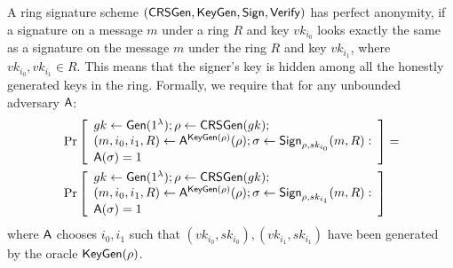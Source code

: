 \begin{definition}
A ring signature scheme
$(\mathsf{CRSGen},\allowbreak \mathsf{KeyGen},\allowbreak \mathsf{Sign}, \mathsf{Verify})$ has perfect anonymity, if a signature on a message
$m$ under a ring $R$ and key $vk_{i_0}$
looks exactly the same as a signature on the
message $m$ under the ring $R$ and key $vk_{i_1}$, where $vk_{i_0},vk_{i_1}\in R$. This means that the signer's key is hidden
among all the honestly generated keys in the ring. Formally, we require that for any unbounded
adversary $\mathsf{A}$:
\begin{align*}
&\Pr\left[\begin{array}{l}
gk\gets\mathsf{Gen}(1^\lambda);\rho\gets\mathsf{CRSGen}(gk);\\
(m,i_0,i_1,R)\gets\mathsf{A}^{\mathsf{KeyGen}(\rho)}(\rho);\sigma\gets\mathsf{Sign}_{\rho,sk_{i_0}}(m,R):\\
\mathsf{A}(\sigma)=1
\end{array}\right]
=\\
&\Pr\left[\begin{array}{l}
gk\gets\mathsf{Gen}(1^\lambda);\rho\gets\mathsf{CRSGen}(gk);\\
(m,i_0,i_1,R)\gets\mathsf{A}^{\mathsf{KeyGen}(\rho)}(\rho);\sigma\gets\mathsf{Sign}_{\rho,sk_{i_1}}(m,R):\\
\mathsf{A}(\sigma)=1
\end{array}\right]
\end{align*}
where $\mathsf{A}$ chooses $i_0, i_1$ such that $(vk_{i_0}, sk_{i_0}),(vk_{i_1}, sk_{i_1})$ have been generated by the
oracle $\mathsf{KeyGen}(\rho)$.
\end{definition}

